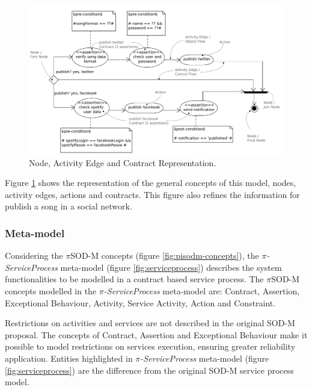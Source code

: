    \begin{figure}[ht!]
\centering
\includegraphics[width=.99\textwidth]{chapters/methodology/figs/otherObjects_detail.pdf}
\caption{Node, Activity Edge and Contract Representation.}
\label{fig:other_representation}
\end{figure}

Figure \ref{fig:other_representation} shows the representation of the general
concepts of this model, nodes, activity edges, actions and contracts. This figure also refines the information
for publish a song in a social network.
  

 \subsubsection{Meta-model} 


Considering the $\pi$SOD-M concepts (figure \ref{fig:pisodm-concepts}), the
\textit{$\pi$-ServiceProcess} meta-model (figure \ref{fig:serviceprocess})
describes the system functionalities to be modelled in a contract based service
process. The $\pi$SOD-M concepts modelled in the \textit{$\pi$-ServiceProcess}
meta-model are: {\sc Contract, Assertion, Exceptional Behaviour, Activity,
Service Activity, Action} and {\sc Constraint}.
 


Restrictions on activities and services are not described in the
original SOD-M proposal. The concepts of {\sc Contract, Assertion} and
{\sc Exceptional Behaviour} make it possible to model restrictions on services
execution, ensuring greater reliability application. Entities highlighted in
\textit{$\pi$-ServiceProcess} meta-model (figure \ref{fig:serviceprocess})  are
the difference from the original SOD-M service process model.

